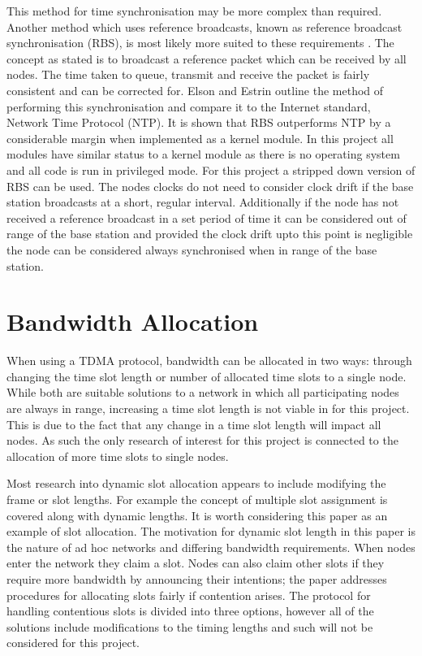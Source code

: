 \documentclass[parskip]{cs4rep}
\begin{document}
This method for time synchronisation may be more complex than required. Another method which uses reference broadcasts, known as reference broadcast synchronisation (RBS),  is most likely more suited to these requirements \cite{PR2}. The concept as stated is to broadcast a reference packet which can be received by all nodes. The time taken to queue, transmit and receive the packet is fairly consistent and can be corrected for. Elson and Estrin outline the method of performing this synchronisation and compare it to the Internet standard, Network Time Protocol (NTP). It is shown that RBS outperforms NTP by a considerable margin when implemented as a kernel module. In this project all modules have similar status to a kernel module as there is no operating system and all code is run in privileged mode. For this project a stripped down version of RBS can be used. The nodes clocks do not need to consider clock drift if the base station broadcasts at a short, regular interval. Additionally if the node has not received a reference broadcast in a set period of time it can be considered out of range of the base station and provided the clock drift upto this point is negligible the node can be considered always synchronised when in range of the base station.

\section{Bandwidth Allocation}

When using a TDMA protocol, bandwidth can be allocated in two ways: through changing the time slot length or number of allocated time slots to a single node. While both are suitable solutions to a network in which all participating nodes are always in range, increasing a time slot length is not viable in for this project. This is due to the fact that any change in a time slot length will impact all nodes. As such the only research of interest for this project is connected to the allocation of more time slots to single nodes.

Most research into dynamic slot allocation appears to include modifying the frame or slot lengths. For example the concept of multiple slot assignment is covered \cite{PR3} along with dynamic lengths. It is worth considering this paper as an example of slot allocation. The motivation for dynamic slot length in this paper is the nature of ad hoc networks and differing bandwidth requirements. When nodes enter the network they claim a slot. Nodes can also claim other slots if they require more bandwidth by announcing their intentions; the paper addresses procedures for allocating slots fairly if contention arises. The protocol for handling contentious slots is divided into three options, however all of the solutions include modifications to the timing lengths and such will not be considered for this project.
\end{document}
